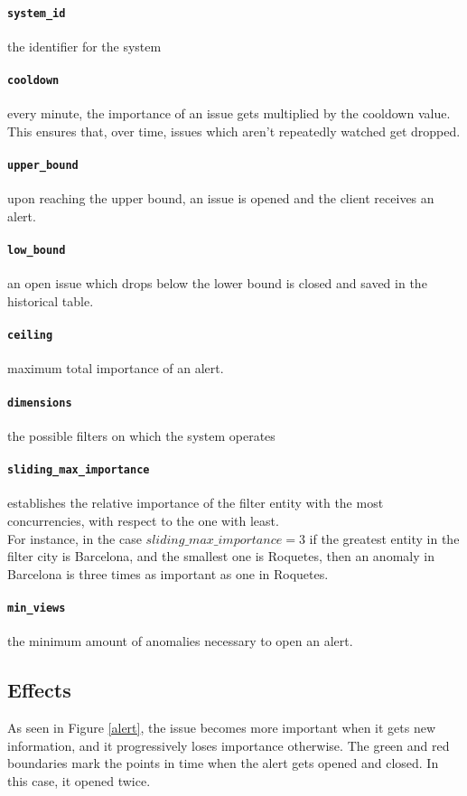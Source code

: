 \documentclass[12pt,titlepage]{article}
\begin{document}
\paragraph{\texttt{system\_id}} the identifier for the system
\paragraph{\texttt{cooldown}} every minute, the importance of an issue gets multiplied by the cooldown value. This ensures that, over time, issues which aren't repeatedly watched get dropped.
\paragraph{\texttt{upper\_bound}} upon reaching the upper bound, an issue is opened and the client receives an alert.
\paragraph{\texttt{low\_bound}} an open issue which drops below the lower bound is closed and saved in the historical table.
\paragraph{\texttt{ceiling}} maximum total importance of an alert.
\paragraph{\texttt{dimensions}} the possible filters on which the system operates
\paragraph{\texttt{sliding\_max\_importance}} establishes the relative importance of the filter entity with the most concurrencies, with respect to the one with least. \\For instance, in the case \texttt{$sliding\_max\_importance=3$} if the greatest entity in the filter city is Barcelona, and the smallest one is Roquetes, then an anomaly in Barcelona is three times as important as one in Roquetes.
\paragraph{\texttt{min\_views}} the minimum amount of anomalies necessary to open an alert.
\newpage
\subsection{Effects}
As seen in Figure \ref{alert}, the issue becomes more important when it gets new information, and it progressively loses importance otherwise. The green and red boundaries mark the points in time when the alert gets opened and closed. In this case, it opened twice.
\end{document}

